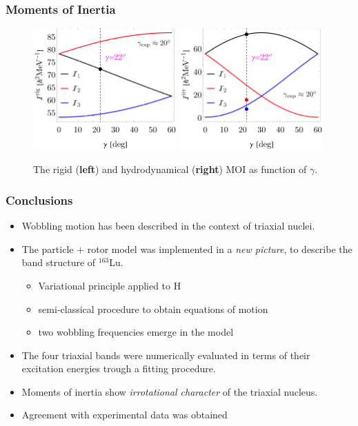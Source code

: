 \documentclass[
	11pt, %
]{beamer}
\begin{document}
\begin{frame}
	\frametitle{Moments of Inertia}
	\begin{figure}	
		\begin{center}
			\includegraphics[width=0.49\textwidth]{figures/rigid-mois.png}
			\includegraphics[width=0.49\textwidth]{figures/hydro-mois.png}
			\caption{The rigid (\textbf{left}) and hydrodynamical (\textbf{right}) MOI as function of $\gamma$.}
		\end{center}
	\end{figure}
\end{frame}


\begin{frame}
	\frametitle{Conclusions}
	\begin{itemize}
		\item Wobbling motion has been described in the context of triaxial nuclei.
		\item The particle + rotor model was implemented in a \emph{new picture}, to describe the band structure of $^{163}$Lu.
		\begin{itemize}
			\item Variational principle applied to H
			\item semi-classical procedure to obtain equations of motion
			\item two wobbling frequencies emerge in the model
		\end{itemize}
		\item The four triaxial bands were numerically evaluated in terms of their excitation energies trough a fitting procedure.
		\item Moments of inertia show \emph{irrotational character} of the triaxial nucleus.
		\item Agreement with experimental data was obtained
	\end{itemize}
\end{frame}
\end{document}
